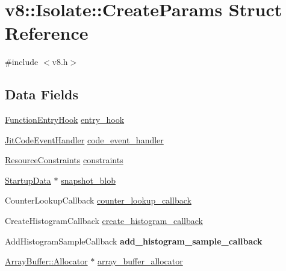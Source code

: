 \hypertarget{structv8_1_1Isolate_1_1CreateParams}{}\section{v8\+:\+:Isolate\+:\+:Create\+Params Struct Reference}
\label{structv8_1_1Isolate_1_1CreateParams}


{\ttfamily \#include $<$v8.\+h$>$}

\subsection*{Data Fields}
\begin{DoxyCompactItemize}
\item 
\hyperlink{namespacev8_aaf07fb6bb13f295da3c6568938b7dec5}{Function\+Entry\+Hook} \hyperlink{structv8_1_1Isolate_1_1CreateParams_aa7aa18bbe2d86713e5b074a93b38dc60}{entry\+\_\+hook}
\item 
\hyperlink{namespacev8_a39243bc91e63d64d111452fdb98c4733}{Jit\+Code\+Event\+Handler} \hyperlink{structv8_1_1Isolate_1_1CreateParams_a783e3eba90ce6e2800bdd69197bbccdd}{code\+\_\+event\+\_\+handler}
\item 
\hyperlink{classv8_1_1ResourceConstraints}{Resource\+Constraints} \hyperlink{structv8_1_1Isolate_1_1CreateParams_a2c570b306aa8c1c24cfe70e8eee50fa1}{constraints}
\item 
\hyperlink{classv8_1_1StartupData}{Startup\+Data} $\ast$ \hyperlink{structv8_1_1Isolate_1_1CreateParams_a25d38476e4dec79ae96c59292eee4a64}{snapshot\+\_\+blob}
\item 
Counter\+Lookup\+Callback \hyperlink{structv8_1_1Isolate_1_1CreateParams_a10441abadd0b83a938303c92e7444fb6}{counter\+\_\+lookup\+\_\+callback}
\item 
Create\+Histogram\+Callback \hyperlink{structv8_1_1Isolate_1_1CreateParams_a11acf5fb9cdbc4c8bf15baf542507b49}{create\+\_\+histogram\+\_\+callback}
\item 
\hypertarget{structv8_1_1Isolate_1_1CreateParams_a3e0fb886996eb1f498b6cc157e11e280}{}Add\+Histogram\+Sample\+Callback {\bfseries add\+\_\+histogram\+\_\+sample\+\_\+callback}\label{structv8_1_1Isolate_1_1CreateParams_a3e0fb886996eb1f498b6cc157e11e280}

\item 
\hyperlink{classv8_1_1ArrayBuffer_1_1Allocator}{Array\+Buffer\+::\+Allocator} $\ast$ \hyperlink{structv8_1_1Isolate_1_1CreateParams_a7c663f70b64290392eeaf164f57585f9}{array\+\_\+buffer\+\_\+allocator}
\end{DoxyCompactItemize}


